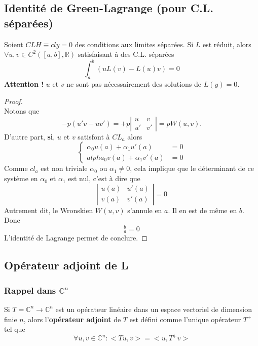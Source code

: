 \documentclass	[11pt, a4paper, openany]{book}
\begin{document}
\subsection{Identité de Green-Lagrange (pour C.L. séparées)}
Soient $CLH \equiv cly = 0$ des conditions aux limites séparées. Si $L$ est réduit, alors $\forall u,v \in C^2([a,b],\mathbb{R})$ satisfaisant à des C.L. séparées
\begin{equation}
\int_a^b (uL(v) - L(u)v) = 0
\end{equation}
\textbf{Attention !} $u$ et $v$ ne sont pas nécessairement des solutions de $L(y) = 0$.
\begin{proof}
\ \\
Notons que
\begin{equation}
-p(u'v - uv') = +p\left|\begin{array}{cc}
u & v\\
u' & v'
\end{array}\right| = pW(u,v).
\end{equation}
D'autre part, \textbf{si}, $u$ et $v$ satisfont à $CL_a$ alors
\begin{equation}
\left\{\begin{array}{ll}
\alpha_0u(a) + \alpha_1u'(a) &= 0\\alpha_0v(a) + \alpha_1v'(a) &= 0
\end{array}\right.
\end{equation}
Comme $cl_a$ est non triviale $\alpha_0$ ou $\alpha_1 \neq 0$, cela implique que le déterminant de ce système en $\alpha_0$ et $\alpha_1$ est nul, c'est à dire que
\begin{equation}
\left|\begin{array}{cc}
u(a) & u'(a)\\
v(a) & v'(a)
\end{array}\right| = 0
\end{equation}
Autrement dit, le Wronskien $W(u,v)$ s'annule en $a$. Il en est de même en $b$. Donc
\begin{equation}
[p(x)W(x;u,v)]_a^b = 0
\end{equation}
L'identité de Lagrange permet de conclure.
\end{proof}

\subsection{Opérateur adjoint de L}
\subsubsection{Rappel dans $\mathbb{C}^n$}
Si $T = \mathbb{C}^n \rightarrow \mathbb{C}^n$ est un opérateur linéaire dans un espace vectoriel de dimension finie $n$, alors l'\textbf{opérateur adjoint} de $T$ est défini comme l'unique opérateur $T^+$ tel que
\begin{equation}
\forall u, v \in \mathbb{C}^n : <Tu,v> = <u,T^+v>
\end{equation}
\end{document}
